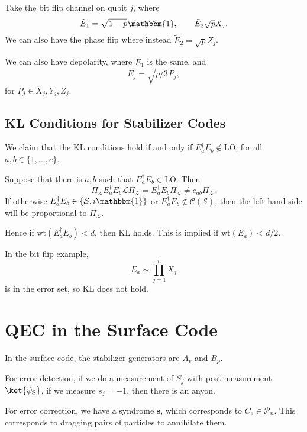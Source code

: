 \documentclass[12pt]{article}
\begin{document}
\begin{exbox}
	Take the bit flip channel on qubit $j$, where
	\[
		\tilde E_1 = \sqrt{1 - p} \mathbbm{1}, \qquad \tilde E_2 \sqrt p X_j.
	\]
	We can also have the phase flip where instead $\tilde E_2 = \sqrt p Z_j$.

	We can also have depolarity, where $\tilde E_1$ is the same, and
	\[
		\tilde E_j = \sqrt{p/3} P_j,
	\]
	for $P_j \in {X_j, Y_j, Z_j}$.
\end{exbox}

\subsection{KL Conditions for Stabilizer Codes}%
\label{sub:klsc}

We claim that the KL conditions hold if and only if $E_a^{\dagger} E_b \not \in \mathrm{LO}$, for all $a, b \in \{1, \ldots, e\}$.

Suppose that there is $a, b$ such that $E_a^{\dagger} E_b \in \mathrm{LO}$. Then
\[
	\Pi_{\mathcal{L}} E_a^{\dagger} E_b \mathcal{L} \Pi_{\mathcal{L}} = E_a^{\dagger} E_b \Pi_{\mathcal{L}} \neq c_{ab} \Pi_{\mathcal{L}}.
\]
If otherwise $E_a^{\dagger} E_b \in \{\mathcal{S}, i \mathbbm{1}\}$ or $E_a^{\dagger} E_b \not \in \mathcal{C}(\mathcal{S})$, then the left hand side will be proportional to $\Pi_{\mathcal{L}}$.

Hence if $\mathrm{wt}(E_a^{\dagger} E_b) < d$, then KL holds. This is implied if $\mathrm{wt}(E_a) < d/2$.

\begin{exbox}
	In the bit flip example,
	\[
	E_a \sim \prod_{j = 1}^{n} X_j
	\]
	is in the error set, so KL does not hold.
\end{exbox}

\newpage

\section{QEC in the Surface Code}%
\label{sec:scqec}

In the surface code, the stabilizer generators are $A_v$ and $B_p$.

For error detection, if we do a measurement of $S_j$ with post measurement $\ket{\psi_{\mathbf{S}}}$, if we measure $s_j = -1$, then there is an anyon.

For error correction, we have a syndrome $\mathbf{s}$, which corresponds to $C_{\mathbf{s}} \in \mathcal{P}_n$. This corresponds to dragging pairs of particles to annihilate them.
\end{document}
